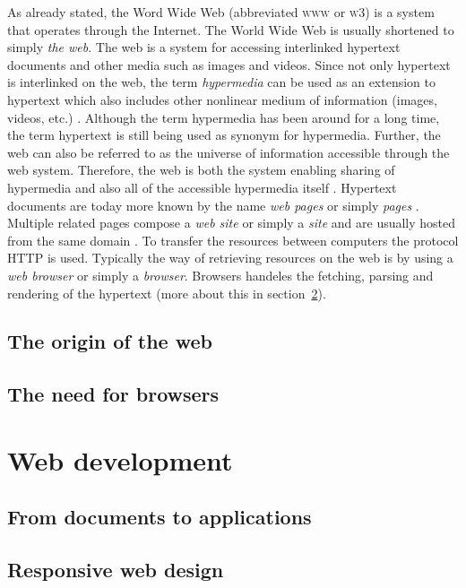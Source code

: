 \documentclass[a4paper,11pt]{kth-mag}
\begin{document}
      As already stated, the Word Wide Web (abbreviated \textsc{www} or \textsc{w3}) is a system that operates through the Internet.
      The World Wide Web is usually shortened to simply \emph{the web}.
      The web is a system for accessing interlinked hypertext documents and other media such as images and videos.
      Since not only hypertext is interlinked on the web, the term \emph{hypermedia} can be used as an extension to hypertext which also includes other nonlinear medium of information (images, videos, etc.) \cite{wiki_hypermedia}.
      Although the term hypermedia has been around for a long time, the term hypertext is still being used as synonym for hypermedia.
      Further, the web can also be referred to as the universe of information accessible through the web system.
      Therefore, the web is both the system enabling sharing of hypermedia and also all of the accessible hypermedia itself \cite{w3c_www}.
      Hypertext documents are today more known by the name \emph{web pages} or simply \emph{pages} \cite{oed}.
      Multiple related pages compose a \emph{web site} or simply a \emph{site} and are usually hosted from the same domain \cite{oed}.
      To transfer the resources between computers the protocol \textsc{HTTP} is used.
      Typically the way of retrieving resources on the web is by using a \emph{web browser} or simply a \emph{browser}.
      Browsers handeles the fetching, parsing and rendering of the hypertext (more about this in section~\ref{sec:browsers}).
      
      \section{The origin of the web}
        
      \section{The need for browsers}
      \label{sec:browsers}


    \chapter{Web development}
      \section{From documents to applications}
      \section{Responsive web design}
\end{document}
